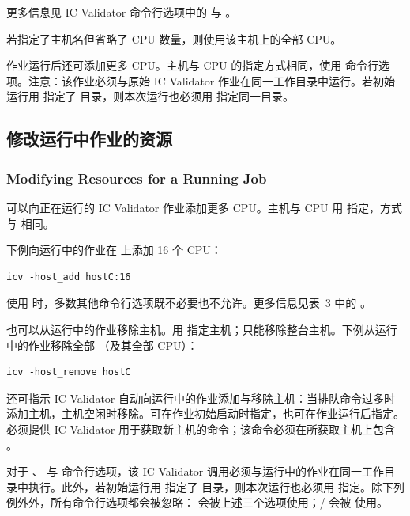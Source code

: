 更多信息见 IC Validator 命令行选项中的  与 。

\begin{noteBox}
若指定了主机名但省略了 CPU 数量，则使用该主机上的全部 CPU。
\end{noteBox}

作业运行后还可添加更多 CPU。主机与 CPU 的指定方式相同，使用  命令行选项。注意：该作业必须与原始 IC Validator 作业在同一工作目录中运行。若初始运行用  指定了  目录，则本次运行也必须用  指定同一目录。

\subsection{修改运行中作业的资源}
\subsubsection*{Modifying Resources for a Running Job}

可以向正在运行的 IC Validator 作业添加更多 CPU。主机与 CPU 用  指定，方式与  相同。

下例向运行中的作业在  上添加 16 个 CPU：
\begin{lstlisting}
icv -host_add hostC:16
\end{lstlisting}

\begin{noteBox}
使用  时，多数其他命令行选项既不必要也不允许。更多信息见表~3 中的 。
\end{noteBox}

也可以从运行中的作业移除主机。用  指定主机；只能移除整台主机。下例从运行中的作业移除全部 （及其全部 CPU）：
\begin{lstlisting}
icv -host_remove hostC
\end{lstlisting}

还可指示 IC Validator 自动向运行中的作业添加与移除主机：当排队命令过多时添加主机，主机空闲时移除。可在作业初始启动时指定，也可在作业运行后指定。必须提供 IC Validator 用于获取新主机的命令；该命令必须在所获取主机上包含 。

对于 、 与  命令行选项，该 IC Validator 调用必须与运行中的作业在同一工作目录中执行。此外，若初始运行用  指定了  目录，则本次运行也必须用  指定。除下列例外外，所有命令行选项都会被忽略： 会被上述三个选项使用；/ 会被  使用。

